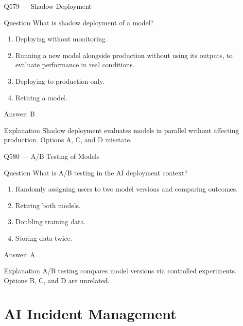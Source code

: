 \documentclass[aspectratio=169,8pt]{beamer}
\begin{document}
	\begin{frame}{Q579 --- Shadow Deployment}
		\begin{block}{Question}
			What is shadow deployment of a model?
			\begin{enumerate}
				\item Deploying without monitoring.
				\item Running a new model alongside production without using its outputs, to evaluate performance in real conditions.
				\item Deploying to production only.
				\item Retiring a model.
			\end{enumerate}
		\end{block}
		\begin{exampleblock}{Answer: B}\end{exampleblock}
		\begin{block}{Explanation}
			Shadow deployment evaluates models in parallel without affecting production. Options A, C, and D misstate.
		\end{block}
	\end{frame}
	
	\begin{frame}{Q580 --- A/B Testing of Models}
		\begin{block}{Question}
			What is A/B testing in the AI deployment context?
			\begin{enumerate}
				\item Randomly assigning users to two model versions and comparing outcomes.
				\item Retiring both models.
				\item Doubling training data.
				\item Storing data twice.
			\end{enumerate}
		\end{block}
		\begin{exampleblock}{Answer: A}\end{exampleblock}
		\begin{block}{Explanation}
			A/B testing compares model versions via controlled experiments. Options B, C, and D are unrelated.
		\end{block}
	\end{frame}
	
	\section{AI Incident Management}
	
\end{document}
